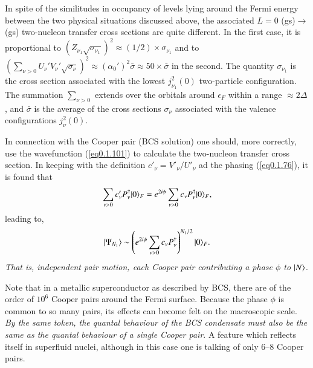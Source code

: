  
 In spite of the similitudes in occupancy of levels lying around the Fermi energy between the two physical situations discussed above, the associated $L=0$ (gs)$\to$(gs) two-nucleon transfer cross sections are quite different. In the first case, it is proportional to $(Z_{\nu_1}\sqrt{\sigma_{\nu_1}})^2\approx(1/2)\times\sigma_{\nu_1}$ and to $(\sum_{\nu>0}U_{\nu}'V_{\nu}'\sqrt{\sigma_\nu})^2\approx(\alpha_0')^2\bar\sigma\approx50\times\bar\sigma$ in the second. The quantity $\sigma_{\nu_1}$ is the cross section associated with the lowest $ j_{\nu_1}^2(0)$ two-particle configuration. The summation $\sum_{\nu>0}$ extends over the orbitals around $\epsilon_F$ within a range $\approx2\Delta$, and $\bar\sigma$ is the average of the cross sections $\sigma_\nu$ associated with the valence configurations $j^2_\nu(0)$.
 
 In connection with the Cooper pair (BCS solution) one should,
  more correctly, use the wavefunction (\ref{eq0.1.101}) to calculate the two-nucleon transfer cross section. In keeping with the definition $c'_\nu=V'_\nu/U'_\nu$ ad the phasing (\ref{eq0.1.76}), it is found that
\begin{align}\label{eq3.4.1}
	\sum_{\nu>0}c'_\nu P_\nu^\dagger|{0} \rangle_F=e^{2i\phi}\sum_{\nu>0}c_\nu P_\nu^\dagger|{0} \rangle_F,
\end{align}
leading to, 
 \begin{align}\label{eq3.4.2}
\ket{\Psi_{N_1}}\sim\left(e^{2i\phi}\sum_{\nu>0}c_\nu P^\dagger_\nu\right)^{N_1/2}\ket{0}_F. \idx{Cooper pair!BCS projected-many pair state}
 \end{align}
 \textit{That is, independent pair motion, each Cooper pair contributing a phase $\phi$ to $|{N} \rangle$}. 
 
 
 Note that in a metallic superconductor as described by BCS, there are of the order of $10^6$ Cooper pairs around the Fermi surface. Because the phase $\phi$ is common to so many pairs, its effects can become felt on the macroscopic scale. \textit{By the same token, the quantal behaviour of the BCS condensate must also be the same as the quantal behaviour of a single Cooper pair}. A feature which reflects itself in superfluid nuclei, although in this case one is talking of only 6--8 Cooper pairs.  
 
